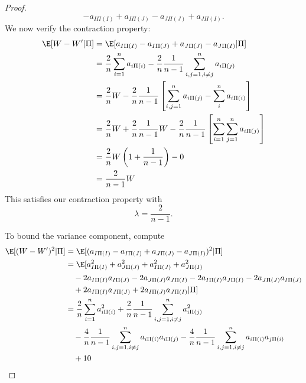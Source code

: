\begin{theorem}
\begin{proof}
\begin{equation}
      - a_{I \Pi(I)} + a_{I \Pi(J)} - a_{J \Pi(J)} + a_{J \Pi(I)}.
    \end{equation}
    We now verify the contraction property:
    \begin{align}
      \E[W - W' | \Pi] &=
      \E[a_{I \Pi(I)} - a_{I \Pi(J)} + a_{J \Pi(J)} - a_{J \Pi(I)} | \Pi] \\
      & = \frac{2}{n}\sum_{i=1}^n a_{i\Pi(i)} - 
      \frac{2}{n}\frac{1}{n-1}\sum_{i,j=1, i \neq j}^n a_{i\Pi(j)} \\
      &= \frac{2}{n} W - 
      \frac{2}{n}\frac{1}{n-1} 
      \left [ 
        \sum_{i,j=1}^n a_{i\Pi(j)} - \sum_{i}^n a_{i\Pi(i)}
      \right ] \\
      &= \frac{2}{n} W + \frac{2}{n}\frac{1}{n-1}W - 
      \frac{2}{n}\frac{1}{n-1}
      \left [ 
        \sum_{i=1}^n \sum_{j=1}^n a_{i\Pi(j)}
      \right ] \\
      &= \frac{2}{n} W \left (1 + \frac{1}{n-1} \right ) - 0 \\
      &= \frac{2}{n-1} W
    \end{align}
    This satisfies our contraction property with 
    \begin{equation}
      \lambda = \frac{2}{n-1}.
    \end{equation}
    
    To bound the variance component, compute
    \begin{equation}
      \begin{split}
        \E [(W-W')^2 | \Pi] 
        &= \E[(a_{I \Pi(I)} - a_{I \Pi(J)} + a_{J \Pi(J)} - a_{J \Pi(I)})^2 | \Pi] \\
        &= \E[ a_{I \Pi(I)}^2 + a_{J \Pi(J)}^2 + a_{I \Pi(J)}^2 + a_{J \Pi(I)}^2 \\
        &\quad - 2a_{I \Pi(I)} a_{I \Pi(J)} - 2a_{J \Pi(J)} a_{J \Pi(I)}
        - 2a_{I \Pi(I)} a_{J \Pi(I)} - 2a_{J \Pi(J)} a_{I \Pi(J)} \\
        &\quad + 2a_{I \Pi(I)} a_{J \Pi(J)} + 2a_{I \Pi(J)} a_{J \Pi(I)} | \Pi ] \\
        &= \frac{2}{n} \sum_{i=1}^n a_{i \Pi(i)}^2 
        + \frac{2}{n}\frac{1}{n-1}\sum_{i,j=1, i\neq j}^n a_{i \Pi(j)}^2 \\
        &\quad - \frac{4}{n}\frac{1}{n-1}\sum_{i,j=1, i\neq j}^n a_{i \Pi(i)}a_{i \Pi(j)}
        - \frac{4}{n}\frac{1}{n-1}\sum_{i,j=1, i\neq j}^n a_{i \Pi(i)}a_{j \Pi(i)} \\
        &\quad + 10
      \end{split}
    \end{equation}
  \end{proof}
\end{theorem}